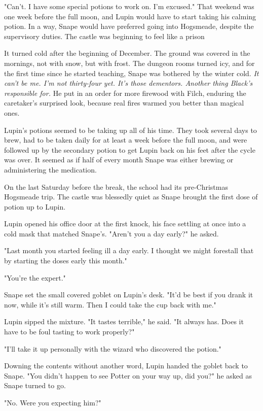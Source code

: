 \documentclass[a4paper,11pt]{article}
\begin{document}
"Can't. I have some special potions to work on. I'm excused." That weekend was one week before the full moon, and Lupin would have to start taking his calming potion. In a way, Snape would have preferred going into Hogsmeade, despite the supervisory duties. The castle was beginning to feel like a prison

It turned cold after the beginning of December. The ground was covered in the mornings, not with snow, but with frost. The dungeon rooms turned icy, and for the first time since he started teaching, Snape was bothered by the winter cold. \emph{It can't be me. I'm not thirty-four yet. It's those dementors. Another thing Black's responsible for.} He put in an order for more firewood with Filch, enduring the caretaker's surprised look, because real fires warmed you better than magical ones.

Lupin's potions seemed to be taking up all of his time. They took several days to brew, had to be taken daily for at least a week before the full moon, and were followed up by the secondary potion to get Lupin back on his feet after the cycle was over. It seemed as if half of every month Snape was either brewing or administering the medication.

On the last Saturday before the break, the school had its pre-Christmas Hogsmeade trip. The castle was blessedly quiet as Snape brought the first dose of potion up to Lupin.

Lupin opened his office door at the first knock, his face settling at once into a cold mask that matched Snape's. "Aren't you a day early?" he asked.

"Last month you started feeling ill a day early. I thought we might forestall that by starting the doses early this month."

"You're the expert."

Snape set the small covered goblet on Lupin's desk. "It'd be best if you drank it now, while it's still warm. Then I could take the cup back with me."

Lupin sipped the mixture. "It tastes terrible," he said. "It always has. Does it have to be foul tasting to work properly?"

"I'll take it up personally with the wizard who discovered the potion."

Downing the contents without another word, Lupin handed the goblet back to Snape. "You didn't happen to see Potter on your way up, did you?" he asked as Snape turned to go.

"No. Were you expecting him?"
\end{document}
